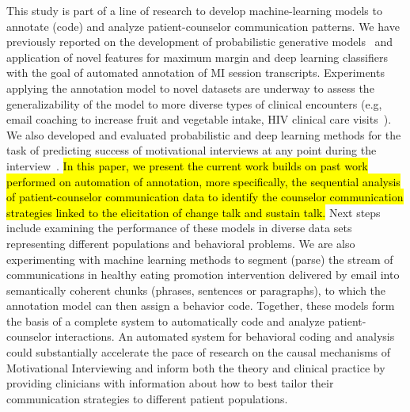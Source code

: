 \documentclass[smallextended]{svjour3}       %
\begin{document}
This study is part of a line of research to develop machine-learning models to annotate (code) and analyze patient-counselor communication patterns. We have previously reported on the development of probabilistic generative models~\cite{kotov2014towards, kotov2015interpretable} and application of novel features for maximum margin and deep learning classifiers~\cite{hasan2016study} with the goal of automated annotation of MI session transcripts. Experiments applying the annotation model to novel datasets are underway to assess the generalizability of the model to more diverse types of clinical encounters (e.g, email coaching to increase fruit and vegetable intake, HIV clinical care visits~\cite{carcone2018using}). We also developed and evaluated probabilistic and deep learning methods for the task of predicting success of motivational interviews at any point during the interview~\cite{hasan2018predicting}. \hl{In this paper, we present the current work builds on past work performed on automation of annotation, more specifically, the sequential analysis of patient-counselor communication data to identify the counselor communication strategies linked to the elicitation of change talk and sustain talk.} Next steps include examining the performance of these models in diverse data sets representing different populations and behavioral problems. We are also experimenting with machine learning methods to segment (parse) the stream of communications in healthy eating promotion intervention delivered by email into semantically coherent chunks (phrases, sentences or paragraphs), to which the annotation model can then assign a behavior code. Together, these models form the basis of a complete system to automatically code and analyze patient-counselor interactions. An automated system for behavioral coding and analysis could substantially accelerate the pace of research on the causal mechanisms of Motivational Interviewing and inform both the theory and clinical practice by providing clinicians with information about how to best tailor their communication strategies to different patient populations. 
\end{document}
